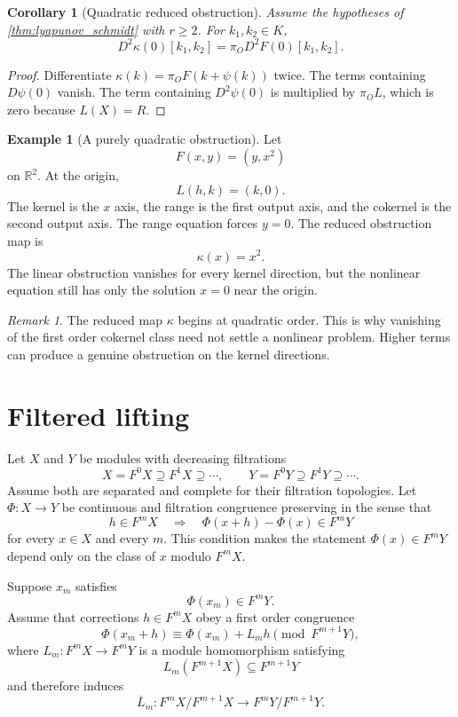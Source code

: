 \documentclass{aomart}
\newtheorem{corollary}[corollary]{Corollary}
\theoremstyle{definition}
\newtheorem{example}[example]{Example}
\theoremstyle{remark}
\newtheorem{remark}[remark]{Remark}
\begin{document}
\begin{corollary}[Quadratic reduced obstruction]\label{cor:quadratic_reduced_obstruction}
Assume the hypotheses of \cref{thm:lyapunov_schmidt} with $r\ge2$.  For $k_1,k_2\in K$,
\[
D^2\kappa(0)[k_1,k_2]
=
\pi_O D^2F(0)[k_1,k_2].
\]
\end{corollary}

\begin{proof}
Differentiate $\kappa(k)=\pi_OF(k+\psi(k))$ twice.  The terms containing $D\psi(0)$ vanish.  The term containing $D^2\psi(0)$ is multiplied by $\pi_OL$, which is zero because $L(X)=R$.
\end{proof}

\begin{example}[A purely quadratic obstruction]\label{ex:pure_quadratic_obstruction}
Let
\[
F(x,y)=(y,x^2)
\]
on $\mathbb R^2$.  At the origin,
\[
L(h,k)=(k,0).
\]
The kernel is the $x$ axis, the range is the first output axis, and the cokernel is the second output axis.  The range equation forces $y=0$.  The reduced obstruction map is
\[
\kappa(x)=x^2.
\]
The linear obstruction vanishes for every kernel direction, but the nonlinear equation still has only the solution $x=0$ near the origin.
\end{example}

\begin{remark}\label{rem:higher_obstruction}
The reduced map $\kappa$ begins at quadratic order.  This is why vanishing of the first order cokernel class need not settle a nonlinear problem.  Higher terms can produce a genuine obstruction on the kernel directions.
\end{remark}

\section{Filtered lifting}\label{sec:filtered_lifting}

Let $X$ and $Y$ be modules with decreasing filtrations
\[
X=F^0X\supseteq F^1X\supseteq\cdots,
\qquad
Y=F^0Y\supseteq F^1Y\supseteq\cdots.
\]
Assume both are separated and complete for their filtration topologies.  Let $\Phi:X\to Y$ be continuous and filtration congruence preserving in the sense that
\[
h\in F^mX
\quad\Longrightarrow\quad
\Phi(x+h)-\Phi(x)\in F^mY
\]
for every $x\in X$ and every $m$.  This condition makes the statement $\Phi(x)\in F^mY$ depend only on the class of $x$ modulo $F^mX$.

Suppose $x_m$ satisfies
\[
\Phi(x_m)\in F^mY.
\]
Assume that corrections $h\in F^mX$ obey a first order congruence
\[
\Phi(x_m+h)
\equiv
\Phi(x_m)+L_mh
\pmod{F^{m+1}Y},
\]
where $L_m:F^mX\to F^mY$ is a module homomorphism satisfying
\[
L_m(F^{m+1}X)\subseteq F^{m+1}Y
\]
and therefore induces
\[
\overline L_m:
F^mX/F^{m+1}X
\longrightarrow
F^mY/F^{m+1}Y.
\]
\end{document}

